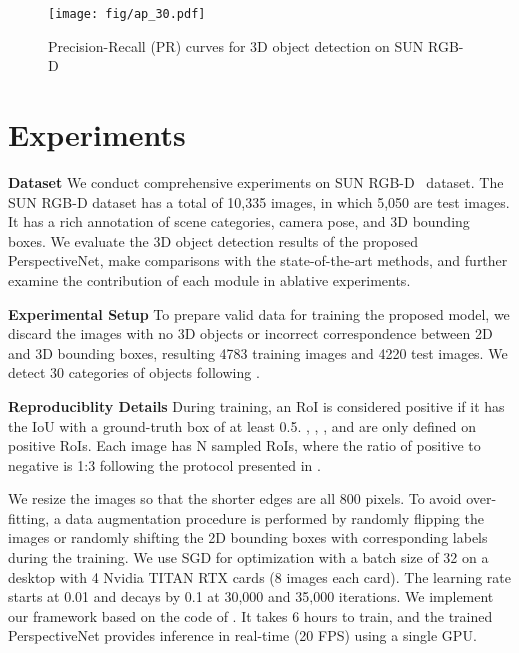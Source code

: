 \documentclass{article}
\begin{document}

\begin{figure}[t!]
    \begin{center}
        \texttt{[image: fig/ap\_30.pdf]}
    \end{center}
    \caption{Precision-Recall (PR) curves for 3D object detection on SUN RGB-D}
    \label{fig:pr_30}
\end{figure}

\section{Experiments}

\textbf{Dataset}\quad{} We conduct comprehensive experiments on SUN RGB-D~\cite{song2015sun} dataset. The SUN RGB-D dataset has a total of 10,335 images, in which 5,050 are test images. It has a rich annotation of scene categories, camera pose, and 3D bounding boxes. We evaluate the 3D object detection results of the proposed PerspectiveNet, make comparisons with the state-of-the-art methods, and further examine the contribution of each module in ablative experiments.

\textbf{Experimental Setup}\quad{} To prepare valid data for training the proposed model, we discard the images with no 3D objects or incorrect correspondence between 2D and 3D bounding boxes, resulting 4783 training images and 4220 test images. We detect 30 categories of objects following \citet{huang2018cooperative}.

\textbf{Reproduciblity Details}\quad{} During training, an RoI is considered positive if it has the IoU with a ground-truth box of at least 0.5. , , , and  are only defined on positive RoIs. Each image has N sampled RoIs, where the ratio of positive to negative is 1:3 following the protocol presented in \citet{girshick2015fast}.

We resize the images so that the shorter edges are all 800 pixels. To avoid over-fitting, a data augmentation procedure is performed by randomly flipping the images or randomly shifting the 2D bounding boxes with corresponding labels during the training. We use SGD for optimization with a batch size of 32 on a desktop with 4 Nvidia TITAN RTX cards (8 images each card). The learning rate starts at 0.01 and decays by 0.1 at 30,000 and 35,000 iterations. We implement our framework based on the code of \citet{massa2018mrcnn}. It takes 6 hours to train, and the trained PerspectiveNet provides inference in real-time (20 FPS) using a single GPU.
\end{document}
